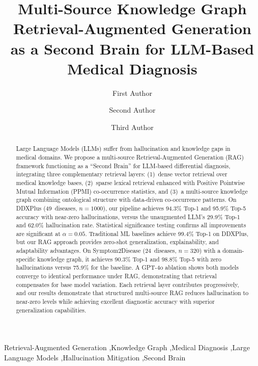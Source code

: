 \documentclass[preprint,12pt]{elsarticle}
\begin{document}
\begin{frontmatter}

\title{Multi-Source Knowledge Graph Retrieval-Augmented Generation\\as a Second Brain for LLM-Based Medical Diagnosis}

\author[addr1]{First Author}
\author[addr1]{Second Author}
\author[addr1]{Third Author}

\address[addr1]{Department of Computer Science, University, Country}

\begin{abstract}
Large Language Models (LLMs) suffer from hallucination and knowledge gaps in medical domains. We propose a multi-source Retrieval-Augmented Generation (RAG) framework functioning as a ``Second Brain'' for LLM-based differential diagnosis, integrating three complementary retrieval layers: (1)~dense vector retrieval over medical knowledge bases, (2)~sparse lexical retrieval enhanced with Positive Pointwise Mutual Information (PPMI) co-occurrence statistics, and (3)~a multi-source knowledge graph combining ontological structure with data-driven co-occurrence patterns. On DDXPlus (49~diseases, $n{=}1000$), our pipeline achieves 94.3\% Top-1 and 95.9\% Top-5 accuracy with near-zero hallucinations, versus the unaugmented LLM's 29.9\% Top-1 and 62.0\% hallucination rate. Statistical significance testing confirms all improvements are significant at $\alpha=0.05$. Traditional ML baselines achieve 99.4\% Top-1 on DDXPlus, but our RAG approach provides zero-shot generalization, explainability, and adaptability advantages. On Symptom2Disease (24~diseases, $n{=}320$) with a domain-specific knowledge graph, it achieves 90.3\% Top-1 and 98.8\% Top-5 with zero hallucinations versus 75.9\% for the baseline. A GPT-4o ablation shows both models converge to identical performance under RAG, demonstrating that retrieval compensates for base model variation. Each retrieval layer contributes progressively, and our results demonstrate that structured multi-source RAG reduces hallucination to near-zero levels while achieving excellent diagnostic accuracy with superior generalization capabilities.
\end{abstract}

\begin{keyword}
Retrieval-Augmented Generation \sep Knowledge Graph \sep Medical Diagnosis \sep Large Language Models \sep Hallucination Mitigation \sep Second Brain
\end{keyword}

\end{frontmatter}
\end{document}
